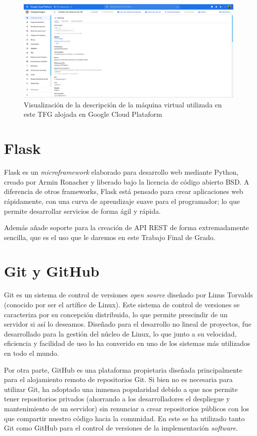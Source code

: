 \documentclass[../main.tex]{subfiles}
\begin{document}
\begin{figure}[h!]
    \centering
    \includegraphics[width=1\textwidth]{imagenes/gcp_mv.png}
    \caption{Visualización de la descripción de la máquina virtual utilizada en este TFG alojada en Google Cloud Plataform}
    \label{fig:gcp_mv}
\end{figure}

\section{Flask}
Flask es un \textit{microframework} elaborado para desarrollo web mediante Python, creado por Armin Ronacher y liberado bajo la licencia de código abierto BSD. A diferencia de otros frameworks, Flask está pensado para crear aplicaciones web rápidamente, con una curva de aprendizaje suave para el programador; lo que permite desarrollar servicios de forma ágil y rápida.
\newline

Además añade soporte para la creación de API REST de forma extremadamente sencilla, que es el uso que le daremos en este Trabajo Final de Grado.

\section{Git y GitHub}

Git es un sistema de control de versiones \textit{open source} diseñado por Linus Torvalds (conocido por ser el artífice de Linux). Este sistema de control de versiones se caracteriza por su concepción distribuida, lo que permite prescindir de un servidor si así lo deseamos. Diseñado para el desarrollo no lineal de proyectos, fue desarrollado para la gestión del núcleo de Linux, lo que junto a su velocidad, eficiencia y facilidad de uso lo ha converido en uno de los sistemas más utilizados en todo el mundo.

Por otra parte, GitHub es una plataforma propietaria diseñada principalmente para el alojamiento remoto de repositorios Git. Si bien no es necesaria para utilizar Git, ha adoptado una inmensa popularidad debido a que nos permite tener repositorios privados (ahorrando a los desarrolladores el despliegue y mantenimiento de un servidor) sin renunciar a crear repositorios públicos con los que compartir nuestro código hacia la comunidad. En este \tfg se ha utilizado tanto Git como GitHub para el control de versiones de la implementación \textit{software}.
\end{document}
